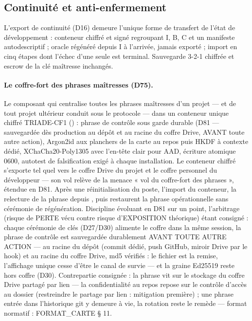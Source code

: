 \subsection{Continuité et anti-enfermement}

L'export de continuité (D16) demeure l'unique forme de transfert de l'état de
développement : conteneur chiffré et signé regroupant I, B, C et un manifeste
autodescriptif ; oracle régénéré depuis I à l'arrivée, jamais exporté ; import en cinq
étapes dont l'échec d'une seule est terminal. Sauvegarde 3-2-1 chiffrée et escrow de la
clé maîtresse inchangés.

\paragraph{Le coffre-fort des phrases maîtresses (D75).} Le composant qui centralise
toutes les phrases maîtresses d'un projet — et de tout projet ultérieur conduit sous le
protocole — dans un conteneur unique chiffré TRIADE-CF1 () :
phrase de contrôle sous garde durable (D81 — sauvegardée dès production au dépôt et au
racine du coffre Drive, AVANT toute autre action), Argon2id aux
planchers de la carte au repos puis HKDF à contexte dédié, XChaCha20-Poly1305 avec
l'en-tête clair pour AAD, écriture atomique 0600, autotest de falsification exigé à
chaque installation. Le conteneur chiffré s'exporte tel quel vers le coffre Drive du
projet et le coffre personnel du développeur — son vol relève de la menace « vol du
coffre-fort des phrases », étendue en D81. Après une réinitialisation du poste, l'import
du conteneur, la relecture de la phrase depuis , puis
 restaurent la phrase opérationnelle sans cérémonie
de régénération. Discipline évoluant en D81 sur un point, l'arbitrage (risque de PERTE
vécu contre risque d'EXPOSITION théorique) étant consigné : chaque cérémonie de clés
(D27/D30) alimente le coffre dans la même session, la phrase de contrôle est sauvegardée
durablement AVANT TOUTE AUTRE ACTION —  au racine du
dépôt (commit dédié, push GitHub, miroir Drive par le hook) et au racine du coffre
Drive, md5 vérifiés : le fichier est la remise, l'affichage unique cesse d'être le canal
de survie — et la graine Ed25519 reste hors coffre (D30). Contrepartie consignée : la
phrase vit sur le stockage du coffre Drive partagé par lien — la confidentialité au
repos repose sur le contrôle d'accès au dossier (restreindre le partage par lien :
mitigation première) ; une phrase entrée dans l'historique git y demeure à vie, la
rotation reste le remède — format normatif : FORMAT\_CARTE § 11.

